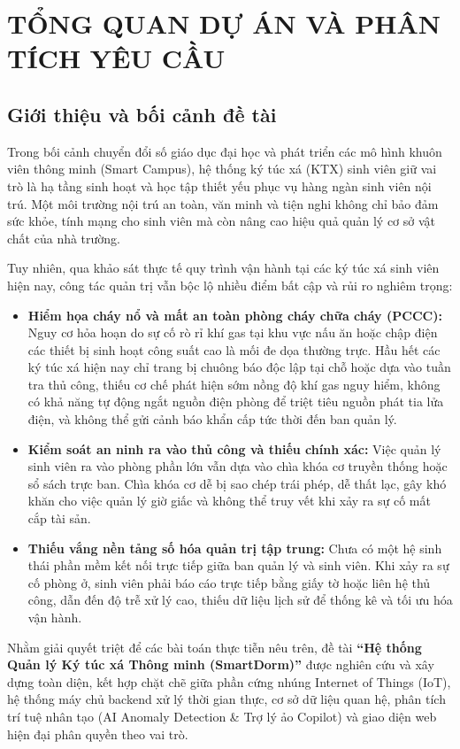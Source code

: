\chapter{TỔNG QUAN DỰ ÁN VÀ PHÂN TÍCH YÊU CẦU}
\label{ch:chuong1}

\section{Giới thiệu và bối cảnh đề tài}
\label{sec:gioi_thieu}

Trong bối cảnh chuyển đổi số giáo dục đại học và phát triển các mô hình khuôn viên thông minh (Smart Campus), hệ thống ký túc xá (KTX) sinh viên giữ vai trò là hạ tầng sinh hoạt và học tập thiết yếu phục vụ hàng ngàn sinh viên nội trú. Một môi trường nội trú an toàn, văn minh và tiện nghi không chỉ bảo đảm sức khỏe, tính mạng cho sinh viên mà còn nâng cao hiệu quả quản lý cơ sở vật chất của nhà trường.

Tuy nhiên, qua khảo sát thực tế quy trình vận hành tại các ký túc xá sinh viên hiện nay, công tác quản trị vẫn bộc lộ nhiều điểm bất cập và rủi ro nghiêm trọng:
\begin{itemize}
    \item \textbf{Hiểm họa cháy nổ và mất an toàn phòng cháy chữa cháy (PCCC):} Nguy cơ hỏa hoạn do sự cố rò rỉ khí gas tại khu vực nấu ăn hoặc chập điện các thiết bị sinh hoạt công suất cao là mối đe dọa thường trực. Hầu hết các ký túc xá hiện nay chỉ trang bị chuông báo độc lập tại chỗ hoặc dựa vào tuần tra thủ công, thiếu cơ chế phát hiện sớm nồng độ khí gas nguy hiểm, không có khả năng tự động ngắt nguồn điện phòng để triệt tiêu nguồn phát tia lửa điện, và không thể gửi cảnh báo khẩn cấp tức thời đến ban quản lý.
    \item \textbf{Kiểm soát an ninh ra vào thủ công và thiếu chính xác:} Việc quản lý sinh viên ra vào phòng phần lớn vẫn dựa vào chìa khóa cơ truyền thống hoặc sổ sách trực ban. Chìa khóa cơ dễ bị sao chép trái phép, dễ thất lạc, gây khó khăn cho việc quản lý giờ giấc và không thể truy vết khi xảy ra sự cố mất cắp tài sản.
    \item \textbf{Thiếu vắng nền tảng số hóa quản trị tập trung:} Chưa có một hệ sinh thái phần mềm kết nối trực tiếp giữa ban quản lý và sinh viên. Khi xảy ra sự cố phòng ở, sinh viên phải báo cáo trực tiếp bằng giấy tờ hoặc liên hệ thủ công, dẫn đến độ trễ xử lý cao, thiếu dữ liệu lịch sử để thống kê và tối ưu hóa vận hành.
\end{itemize}

Nhằm giải quyết triệt để các bài toán thực tiễn nêu trên, đề tài \textbf{``Hệ thống Quản lý Ký túc xá Thông minh (SmartDorm)''} được nghiên cứu và xây dựng toàn diện, kết hợp chặt chẽ giữa phần cứng nhúng Internet of Things (IoT), hệ thống máy chủ backend xử lý thời gian thực, cơ sở dữ liệu quan hệ, phân tích trí tuệ nhân tạo (AI Anomaly Detection \& Trợ lý ảo Copilot) và giao diện web hiện đại phân quyền theo vai trò.

